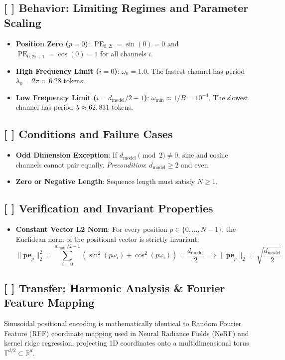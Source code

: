 \documentclass[11pt,a4paper]{article}
\theoremstyle{definition}
\begin{document}
\subsection{[ ] Behavior: Limiting Regimes and Parameter Scaling}
\begin{itemize}
    \item \textbf{Position Zero ($p = 0$)}: $\operatorname{PE}_{0, 2i} = \sin(0) = 0$ and $\operatorname{PE}_{0, 2i+1} = \cos(0) = 1$ for all channels $i$.
    \item \textbf{High Frequency Limit ($i = 0$)}: $\omega_0 = 1.0$. The fastest channel has period $\lambda_0 = 2\pi \approx 6.28$ tokens.
    \item \textbf{Low Frequency Limit ($i = d_{\text{model}}/2 - 1$)}: $\omega_{\text{min}} \approx 1/B = 10^{-4}$. The slowest channel has period $\lambda \approx 62,831$ tokens.
\end{itemize}

\subsection{[ ] Conditions and Failure Cases}
\begin{itemize}
    \item \textbf{Odd Dimension Exception}: If $d_{\text{model}} \pmod 2 \ne 0$, sine and cosine channels cannot pair equally. \emph{Precondition}: $d_{\text{model}} \ge 2$ and even.
    \item \textbf{Zero or Negative Length}: Sequence length must satisfy $N \ge 1$.
\end{itemize}

\subsection{[ ] Verification and Invariant Properties}
\begin{itemize}
    \item \textbf{Constant Vector L2 Norm}: For every position $p \in \{0, \dots, N-1\}$, the Euclidean norm of the positional vector is strictly invariant:
    {\boldmath
    \begin{equation}
    \|\mathbf{pe}_p\|_2^2 = \sum_{i=0}^{d_{\text{model}}/2 - 1} \left( \sin^2(p\omega_i) + \cos^2(p\omega_i) \right) = \frac{d_{\text{model}}}{2} \implies \|\mathbf{pe}_p\|_2 = \sqrt{\frac{d_{\text{model}}}{2}}
    \end{equation}
    }
\end{itemize}

\subsection{[ ] Transfer: Harmonic Analysis & Fourier Feature Mapping}
Sinusoidal positional encoding is mathematically identical to Random Fourier Feature (RFF) coordinate mapping used in Neural Radiance Fields (NeRF) and kernel ridge regression, projecting 1D coordinates onto a multidimensional torus $\mathbb{T}^{d/2} \subset \mathbb{R}^d$.
\end{document}
